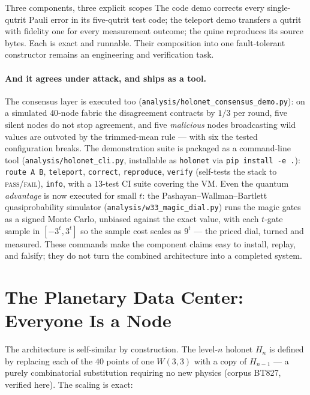 \documentclass[11pt]{article}
\begin{document}
\begin{keybox}{Three components, three explicit scopes}
The code demo corrects every single-qutrit Pauli error in its five-qutrit test code; the teleport demo
transfers a qutrit with fidelity one for every measurement outcome; the quine reproduces its source
bytes. Each is exact and runnable. Their composition into one fault-tolerant constructor remains an
engineering and verification task.
\end{keybox}

\paragraph{And it agrees under attack, and ships as a tool.} The consensus layer is executed too
(\texttt{analysis/holonet\_consensus\_demo.py}): on a simulated $40$-node fabric the disagreement
contracts by $1/3$ per round, five silent nodes do not stop agreement, and five \emph{malicious} nodes
broadcasting wild values are outvoted by the trimmed-mean rule --- with six the tested configuration
breaks. The demonstration suite is packaged as a command-line tool
(\texttt{analysis/holonet\_cli.py}, installable as \texttt{holonet} via \texttt{pip install -e .}):
\texttt{route A B}, \texttt{teleport}, \texttt{correct}, \texttt{reproduce}, \texttt{verify} (self-tests
the stack to \textsc{pass}/\textsc{fail}), \texttt{info}, with a $13$-test CI suite covering the VM.
Even the quantum \emph{advantage} is now executed for small $t$: the Pashayan--Wallman--Bartlett
quasiprobability simulator (\texttt{analysis/w33\_magic\_dial.py}) runs the magic gates as a signed
Monte Carlo, unbiased against the exact value, with each $t$-gate sample in $[-3^t,3^t]$ so the sample
cost scales as $9^t$ --- the priced dial, turned and measured. These commands make the component claims
easy to install, replay, and falsify; they do not turn the combined architecture into a completed system.

\section{The Planetary Data Center: Everyone Is a Node}
\label{sec:planetary}
The architecture is self-similar by construction. The level-$n$ holonet $H_n$ is defined by replacing
each of the $40$ points of one $W(3,3)$ with a copy of $H_{n-1}$ --- a purely combinatorial
substitution requiring no new physics (corpus BT827, verified here). The scaling is exact:
\end{document}
